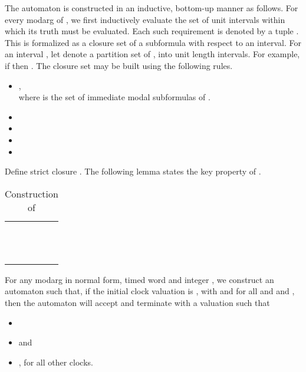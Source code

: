 \documentclass{llncs}
\begin{document}
The automaton  is constructed in an inductive, bottom-up manner as follows.
For every modarg  of , we first inductively evaluate the set of unit intervals within which its truth must be evaluated. Each such requirement is denoted by a tuple . This is formalized as a closure set of a subformula with respect to an interval.  For an interval , let  denote a partition set of , into unit length intervals. For example, if  then . The closure set may be built using the following rules.
\begin{itemize}
\item ,\\
where  is the set of immediate modal subformulas of .
 \item 
\item 
 \item 
 \item 
\end{itemize}
Define strict closure . The following lemma states the key property of .


\begin{table}
\begin{center}
\begin{tabular}{|l|l|}
\hline
&\\
[-1.5ex]
 &  \\ 
[1ex]
\hline
&\\
[-1.5ex]
 &  \\
                       & \\ 
[1ex]
\hline 
&\\
[-1.5ex]
 &  \\
                       &  \\ 
[1ex]
\hline 
&\\
[-1.5ex]
 &  \\
[1ex]
\hline 
&\\
[-1.5ex]
 &  \\
[1ex]
\hline 
\end{tabular}
\caption{Construction of }
\label{tab:guard}
\end{center}
\end{table}




\begin{lemma}
\label{lem:embedtwob}
For any modarg  in normal form, timed word  and integer , we construct an automaton  such that, if the initial clock valuation is , with 
 and  for all  and  and , then 
the automaton  will accept  and terminate with a valuation  such that
\begin{itemize}
 \item 
 \item   and
\item , for all other clocks.
\end{itemize}
\end{lemma}
\end{document}
